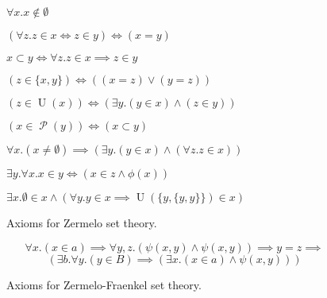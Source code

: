 \begin{figure}
  \begin{axz}\label{axz:empty}
    $\forall x. x \notin \emptyset$
  \end{axz}
  \begin{axz}[extensionality]\label{axz:extensionality}
    $(\forall z. z \in x \iff z \in y) \iff (x = y)$
  \end{axz}
  \begin{axz}[subset]\label{axz:subset}
    $x\subset y \iff \forall z. z \in x \implies z \in y$
  \end{axz}
  \begin{axz}[pair]\label{axz:pair}
    $(z \in \lbrace x, y\rbrace) \iff ((x = z) \lor (y = z))$
  \end{axz}
  \begin{axz}[union]\label{axz:union}
    $(z \in \operatorname{U}(x)) \iff (\exists y. (y \in x) \land (z \in y))$
  \end{axz}
  \begin{axz}[power]\label{axz:power}
    $(x \in \operatorname{\mathcal{P}}(y)) \iff (x \subset y)$
  \end{axz}
  \begin{axz}[foundation]\label{axz:foundation}
    $\forall x. (x \neq \emptyset) \implies (\exists y. (y \in x) \land (\forall z. z \in x))$
  \end{axz}
  \begin{axz}\label{axz:comprehension}
    $\exists y. \forall x. x \in y \iff (x \in z \land \phi(x))$
  \end{axz}
  \begin{axz}[infinity]\label{axz:infinity}
    $\exists x. \emptyset \in x \land (\forall y. y \in x \implies \operatorname{U}(\lbrace y, \lbrace y, y \rbrace \rbrace) \in x)$
  \end{axz}
  \caption{Axioms for Zermelo set theory.}
  \label{fig:axiomsz}
\end{figure}

\begin{figure}
  \begin{axzf}\label{axzf:replacement}
    $$\forall x. (x \in a) \implies \forall y, z.  (\psi(x, y) \land \psi(x, y)) \implies y = z \implies $$
    $$(\exists b. \forall y. (y \in B) \implies (\exists x. (x \in a) \land \psi(x, y)))$$
  \end{axzf}
  \caption{Axioms for Zermelo-Fraenkel set theory.}
  \label{fig:axiomszf}
\end{figure}

